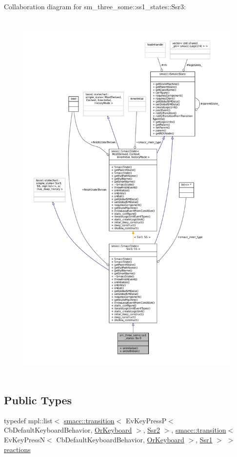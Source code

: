 Collaboration diagram for sm\+\_\+three\+\_\+some\+:\+:ss1\+\_\+states\+:\+:Ssr3\+:
\nopagebreak
\begin{figure}[H]
\begin{center}
\leavevmode
\includegraphics[height=550pt]{structsm__three__some_1_1ss1__states_1_1Ssr3__coll__graph}
\end{center}
\end{figure}
\subsection*{Public Types}
\begin{DoxyCompactItemize}
\item 
typedef mpl\+::list$<$ \hyperlink{classsmacc_1_1transition}{smacc\+::transition}$<$ Ev\+Key\+PressP$<$ Cb\+Default\+Keyboard\+Behavior, \hyperlink{classsm__three__some_1_1OrKeyboard}{Or\+Keyboard} $>$, \hyperlink{structsm__three__some_1_1ss1__states_1_1Ssr2}{Ssr2} $>$, \hyperlink{classsmacc_1_1transition}{smacc\+::transition}$<$ Ev\+Key\+PressN$<$ Cb\+Default\+Keyboard\+Behavior, \hyperlink{classsm__three__some_1_1OrKeyboard}{Or\+Keyboard} $>$, \hyperlink{structsm__three__some_1_1ss1__states_1_1Ssr1}{Ssr1} $>$ $>$ \hyperlink{structsm__three__some_1_1ss1__states_1_1Ssr3_a64398eb9ee5d9d1fa7519a67d31aa3e5}{reactions}
\end{DoxyCompactItemize}
